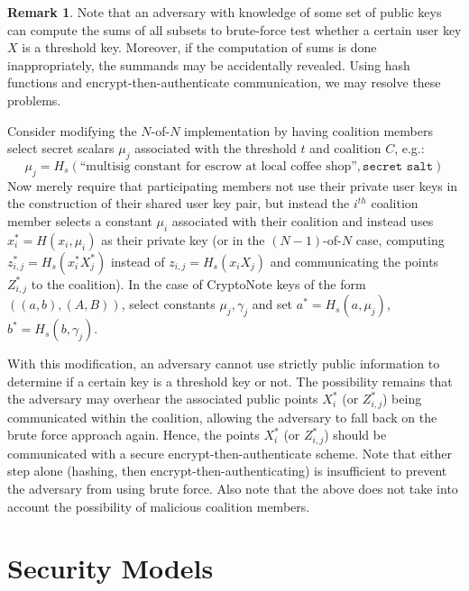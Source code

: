 \documentclass{mrl}
\theoremstyle{definition}
\newtheorem{disc}[theorem]{Remark}
\begin{document}
\begin{disc}\label{hashed-keys}
Note that an adversary with knowledge of some set of public keys can compute the sums of all subsets to brute-force test whether a certain user key $X$ is a threshold key. Moreover, if the computation of sums is done inappropriately, the summands may be accidentally revealed. Using hash functions and encrypt-then-authenticate communication, we may resolve these problems.

Consider modifying the $N$-of-$N$ implementation by having coalition members select secret scalars $\mu_j$ associated with the threshold $t$ and coalition $C$, e.g.:
\[\mu_j = H_s(\text{``multisig constant for escrow at local coffee shop''}, \texttt{secret salt})\] 
Now merely require that participating members not use their private user keys in the construction of their shared user key pair, but instead the $i^{th}$ coalition member selects a constant $\mu_i$ associated with their coalition and instead uses $x^*_i = H(x_i, \mu_i)$ as their private key (or in the $(N-1)$-of-$N$ case, computing $z^*_{i,j} = H_s(x_i^* X_j^*)$ instead of $z_{i,j} = H_s(x_i X_j)$ and communicating the points $Z^*_{i,j}$ to the coalition). In the case of CryptoNote keys of the form $((a,b), (A,B))$, select constants $\mu_j, \gamma_j$ and set $a^* = H_s(a, \mu_j)$, $b^*=H_s(b,\gamma_j)$.

With this modification, an adversary cannot use strictly public information to determine if a certain key is a threshold key or not. The possibility remains that the adversary may overhear the associated public points $X^*_i$ (or $Z^*_{i,j}$) being communicated within the coalition, allowing the adversary to fall back on the brute force approach again. Hence, the points $X^*_i$ (or $Z^*_{i,j}$) should be communicated with a secure encrypt-then-authenticate scheme. Note that either step alone (hashing, then encrypt-then-authenticating) is insufficient to prevent the adversary from using brute force. Also note that the above does not take into account the possibility of malicious coalition members.
\end{disc}



\section{Security Models}

\end{document}
